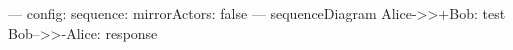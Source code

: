 \documentclass[border=4pt,varwidth=20cm]{standalone}
\begin{document}
\begin{mermaid}
---
config:
  sequence:
    mirrorActors: false
---
sequenceDiagram
  Alice->>+Bob: test
  Bob-->>-Alice: response
\end{mermaid}
\end{document}
